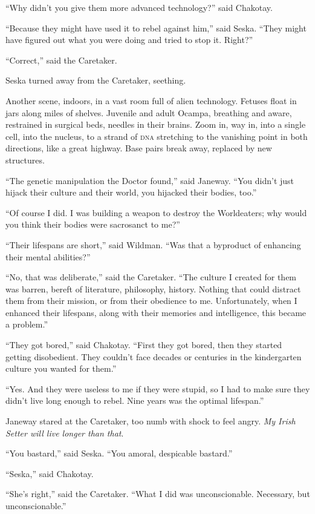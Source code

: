 \documentclass[twoside,letterpaper,12pt]{memoir}
\begin{document}
``Why didn’t you give them more advanced technology?'' said Chakotay. 

``Because they might have used it to rebel against him,'' said Seska. ``They might have figured out what you were doing and tried to stop it. Right?'' 

``Correct,'' said the Caretaker. 

Seska turned away from the Caretaker, seething. 

Another scene, indoors, in a vast room full of alien technology. Fetuses float in jars along miles of shelves. Juvenile and adult Ocampa, breathing and aware, restrained in surgical beds, needles in their brains. Zoom in, way in, into a single cell, into the nucleus, to a strand of \textsc{dna} stretching to the vanishing point in both directions, like a great highway. Base pairs break away, replaced by new structures. 

``The genetic manipulation the Doctor found,'' said Janeway. ``You didn’t just hijack their culture and their world, you hijacked their bodies, too.'' 

``Of course I did. I was building a weapon to destroy the Worldeaters; why would you think their bodies were sacrosanct to me?'' 

``Their lifespans are short,'' said Wildman. ``Was that a byproduct of enhancing their mental abilities?'' 

``No, that was deliberate,'' said the Caretaker. ``The culture I created for them was barren, bereft of literature, philosophy, history. Nothing that could distract them from their mission, or from their obedience to me. Unfortunately, when I enhanced their lifespans, along with their memories and intelligence, this became a problem.'' 

``They got bored,'' said Chakotay. ``First they got bored, then they started getting disobedient. They couldn’t face decades or centuries in the kindergarten culture you wanted for them.'' 

``Yes. And they were useless to me if they were stupid, so I had to make sure they didn’t live long enough to rebel. Nine years was the optimal lifespan.'' 

Janeway stared at the Caretaker, too numb with shock to feel angry. \textit{My Irish Setter will live longer than that}. 

``You bastard,'' said Seska. ``You amoral, despicable bastard.'' 

``Seska,'' said Chakotay. 

``She’s right,'' said the Caretaker. ``What I did was unconscionable. Necessary, but unconscionable.'' 
\end{document}
